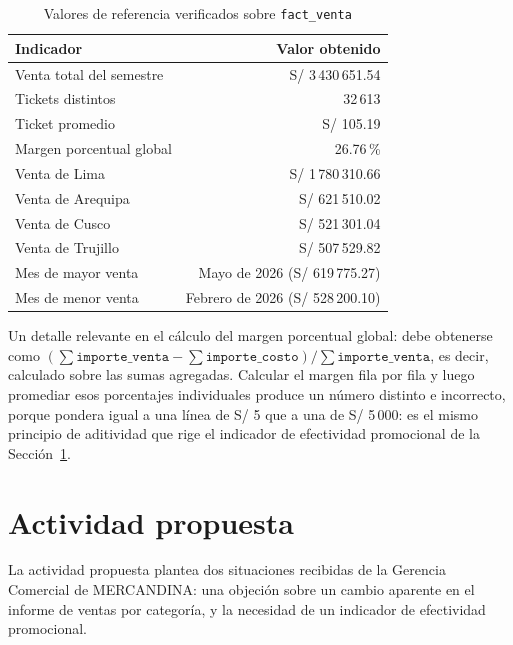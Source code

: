 \documentclass[11pt,a4paper]{article}
\begin{document}
\begin{table}[h!]
\centering
\caption{Valores de referencia verificados sobre \texttt{fact\_venta}}
\label{tab:referencia}
\begin{tabular}{lr}
\toprule
\textbf{Indicador} & \textbf{Valor obtenido} \\
\midrule
Venta total del semestre     & S/ 3\,430\,651.54 \\
Tickets distintos            & 32\,613 \\
Ticket promedio              & S/ 105.19 \\
Margen porcentual global     & 26.76\,\% \\
Venta de Lima                & S/ 1\,780\,310.66 \\
Venta de Arequipa            & S/ 621\,510.02 \\
Venta de Cusco               & S/ 521\,301.04 \\
Venta de Trujillo            & S/ 507\,529.82 \\
Mes de mayor venta           & Mayo de 2026 (S/ 619\,775.27) \\
Mes de menor venta           & Febrero de 2026 (S/ 528\,200.10) \\
\bottomrule
\end{tabular}
\end{table}

Un detalle relevante en el cálculo del margen porcentual global: debe obtenerse como
$\left(\sum \texttt{importe\_venta} - \sum \texttt{importe\_costo}\right) / \sum \texttt{importe\_venta}$,
es decir, calculado sobre las sumas agregadas. Calcular el margen fila por fila y luego promediar esos porcentajes individuales produce un número distinto e incorrecto, porque pondera igual a una línea de S/ 5 que a una de S/ 5\,000: es el mismo principio de aditividad que rige el indicador de efectividad promocional de la Sección~\ref{sec:actividad}.

\newpage
\section{Actividad propuesta}
\label{sec:actividad}

La actividad propuesta plantea dos situaciones recibidas de la Gerencia Comercial de MERCANDINA: una objeción sobre un cambio aparente en el informe de ventas por categoría, y la necesidad de un indicador de efectividad promocional.
\end{document}
